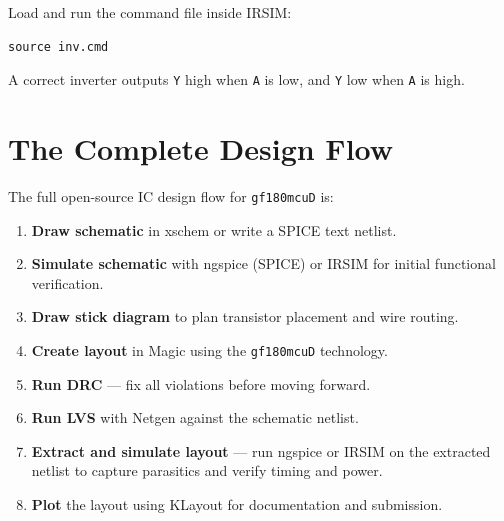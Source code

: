 \documentclass[11pt]{article}
\begin{document}
Load and run the command file inside IRSIM:

\begin{lstlisting}
source inv.cmd
\end{lstlisting}

A correct inverter outputs \texttt{Y} high when \texttt{A} is low, and
\texttt{Y} low when \texttt{A} is high.

\section{The Complete Design Flow}

The full open-source IC design flow for \texttt{gf180mcuD} is:

\begin{enumerate}[leftmargin=2em]
  \item \textbf{Draw schematic} in xschem or write a SPICE text netlist.
  \item \textbf{Simulate schematic} with ngspice (SPICE) or IRSIM for
        initial functional verification.
  \item \textbf{Draw stick diagram} to plan transistor placement and
        wire routing.
  \item \textbf{Create layout} in Magic using the \texttt{gf180mcuD}
        technology.
  \item \textbf{Run DRC} --- fix all violations before moving forward.
  \item \textbf{Run LVS} with Netgen against the schematic netlist.
  \item \textbf{Extract and simulate layout} --- run ngspice or IRSIM
        on the extracted netlist to capture parasitics and verify timing
        and power.
  \item \textbf{Plot} the layout using KLayout for documentation and
        submission.
\end{enumerate}
\clearpage
\end{document}
